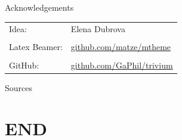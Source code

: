 \documentclass[10pt, compress]{beamer}
\begin{document}
\begin{frame}{Acknowledgements}
\begin{table}
\centering
\begin{tabular}{l l}
Idea: & Elena Dubrova\\
& \\
Latex Beamer: & \url{github.com/matze/mtheme}\\
& \\
GitHub: & \url{github.com/GaPhil/trivium}
\end{tabular}
\end{table}
\end{frame}

\begin{frame}{Sources}

\nocite{*}
\end{frame}


\section{END}
\end{document}
